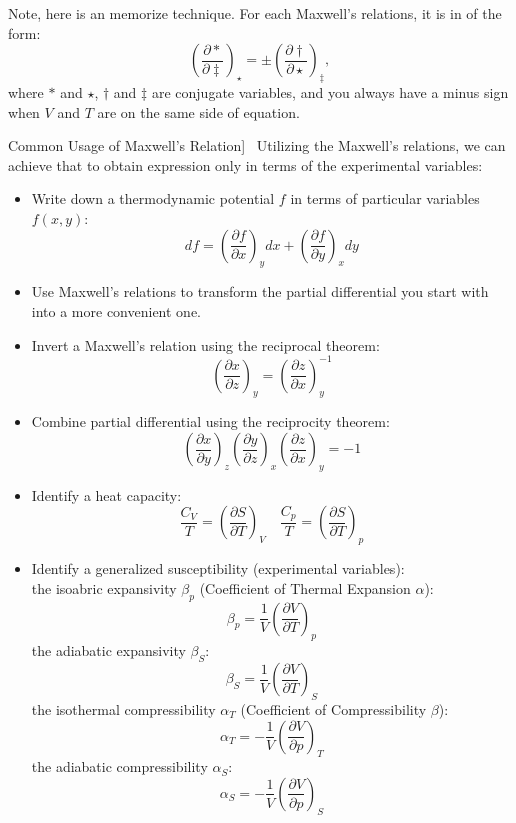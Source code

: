 \documentclass[UTF8]{book}
\newenvironment{theorem}[2][Theorem]{\begin{trivlist}
\item[\hskip \labelsep {\bfseries #1}\hskip \labelsep {\bfseries }]}{\end{trivlist}}
\begin{document}
Note, here is an memorize technique. For each Maxwell's relations, it is in of the form:
$$\left(\dfrac{\partial \ast}{\partial \ddagger}\right)_\star=\pm \left(\dfrac{\partial \dagger}{\partial \star}\right)_\ddagger,$$
where $\ast $ and $\star$, $\dagger$ and $\ddagger$ are conjugate variables, and you always have a minus sign when $V$ and $T$ are on the same side of equation.

\begin{theorem}
[Common Usage of Maxwell's Relation]~  {Utilizing the Maxwell's relations, we can achieve that to obtain expression only in terms of the experimental variables:}
\begin{itemize}
\item  {Write down a thermodynamic potential $f$ in terms of particular variables $f(x,y)$:}
$$df=\left(\dfrac{\partial f}{\partial x}\right)_ydx+\left(\dfrac{\partial f}{\partial y}\right)_xdy$$
\item  {Use Maxwell's relations to transform the partial differential you start with into a more convenient one.} 
\item  {Invert a Maxwell's relation using the reciprocal theorem:}
$$\left(\dfrac{\partial x}{\partial z}\right)_y=\left(\dfrac{\partial z}{\partial x}\right)_y^{-1}$$
\item  {Combine partial differential using the reciprocity theorem:}
$$\left(\dfrac{\partial x}{\partial y}\right)_z\left(\dfrac{\partial y}{\partial z}\right)_x\left(\dfrac{\partial z}{\partial x}\right)_y=-1$$
\item  {Identify a heat capacity:}
$$\dfrac{C_V}{T}=\left(\dfrac{\partial S}{\partial T}\right)_V \quad \dfrac{C_p}{T}=\left(\dfrac{\partial S}{\partial T}\right)_p$$
\item  {Identify a generalized susceptibility (experimental variables):}\\
 {the isoabric expansivity $\beta _p$ (Coefficient of Thermal Expansion $\alpha$):}
$$\beta _p =\dfrac{1}{V}\left(\dfrac{\partial V}{\partial T}\right)_p$$
 {the adiabatic expansivity $\beta_S$:}
$$\beta _S =\dfrac{1}{V}\left(\dfrac{\partial V}{\partial T}\right)_S$$
 {the isothermal compressibility $\alpha _T$ (Coefficient of Compressibility $\beta$):}
$$\alpha _T =-\dfrac{1}{V}\left(\dfrac{\partial V}{\partial p}\right)_T$$
 {the adiabatic compressibility $\alpha _S$:}
$$\alpha _S =-\dfrac{1}{V}\left(\dfrac{\partial V}{\partial p}\right)_S$$
\end{itemize}
\end{theorem}
\end{document}
